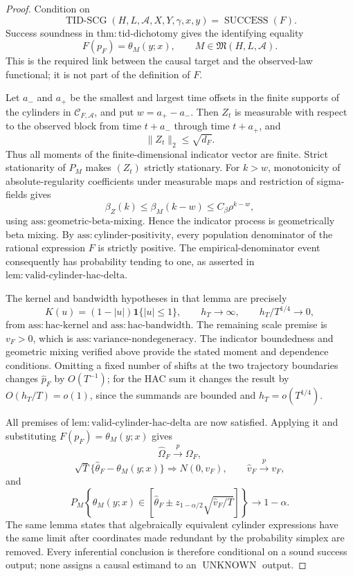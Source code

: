 \documentclass{article}
\begin{document}
\begin{proof}
Condition on
\[
 \operatorname{TID\text{-}SCG}(H,L,\mathcal A,X,Y,\gamma,x,y)
 =\operatorname{SUCCESS}(F).
\]
Success soundness in \(\mathrm{thm:tid\text{-}dichotomy}\) gives the identifying equality
\[
 F(p_F)=\theta_M(y;x),
 \qquad M\in\mathfrak M(H,L,\mathcal A).
\]
This is the required link between the causal target and the observed-law functional; it is not part of the definition of \(F\).

Let \(a_-\) and \(a_+\) be the smallest and largest time offsets in the finite supports of the cylinders in \(\mathcal C_{F,\mathcal A}\), and put \(w=a_+-a_-\).  Then \(Z_t\) is measurable with respect to the observed block from time \(t+a_-\) through time \(t+a_+\), and
\[
 \lVert Z_t\rVert_2\leq\sqrt{d_F}.
\]
Thus all moments of the finite-dimensional indicator vector are finite.  Strict stationarity of \(P_M\) makes \((Z_t)\) strictly stationary.  For \(k>w\), monotonicity of absolute-regularity coefficients under measurable maps and restriction of sigma-fields gives
\[
 \beta_Z(k)\leq\beta_M(k-w)
 \leq C_\beta\rho^{k-w},
\]
using \(\mathrm{ass:geometric\text{-}beta\text{-}mixing}\).  Hence the indicator process is geometrically beta mixing.  By \(\mathrm{ass:cylinder\text{-}positivity}\), every population denominator of the rational expression \(F\) is strictly positive.  The empirical-denominator event consequently has probability tending to one, as asserted in \(\mathrm{lem:valid\text{-}cylinder\text{-}hac\text{-}delta}\).

The kernel and bandwidth hypotheses in that lemma are precisely
\[
 K(u)=(1-|u|)\mathbf 1\{|u|\leq1\},\qquad
 h_T\to\infty,\qquad h_T/T^{1/4}\to0,
\]
from \(\mathrm{ass:hac\text{-}kernel}\) and \(\mathrm{ass:hac\text{-}bandwidth}\).  The remaining scale premise is \(v_F>0\), which is \(\mathrm{ass:variance\text{-}nondegeneracy}\).  The indicator boundedness and geometric mixing verified above provide the stated moment and dependence conditions.  Omitting a fixed number of shifts at the two trajectory boundaries changes \(\widehat p_F\) by \(O(T^{-1})\); for the HAC sum it changes the result by \(O(h_T/T)=o(1)\), since the summands are bounded and \(h_T=o(T^{1/4})\).

All premises of \(\mathrm{lem:valid\text{-}cylinder\text{-}hac\text{-}delta}\) are now satisfied.  Applying it and substituting \(F(p_F)=\theta_M(y;x)\) gives
\[
 \widehat\Omega_F\overset p\longrightarrow\Omega_F,
\]
\[
 \sqrt T\{\widehat\theta_F-\theta_M(y;x)\}
 \Rightarrow N(0,v_F),
 \qquad
 \widehat v_F\overset p\longrightarrow v_F,
\]
and
\[
 P_M\!\left\{\theta_M(y;x)\in
 \left[\widehat\theta_F\pm
 z_{1-\alpha/2}\sqrt{\widehat v_F/T}\right]\right\}
 \longrightarrow1-\alpha.
\]
The same lemma states that algebraically equivalent cylinder expressions have the same limit after coordinates made redundant by the probability simplex are removed.  Every inferential conclusion is therefore conditional on a sound success output; none assigns a causal estimand to an \(\operatorname{UNKNOWN}\) output.
\end{proof}
\end{document}
